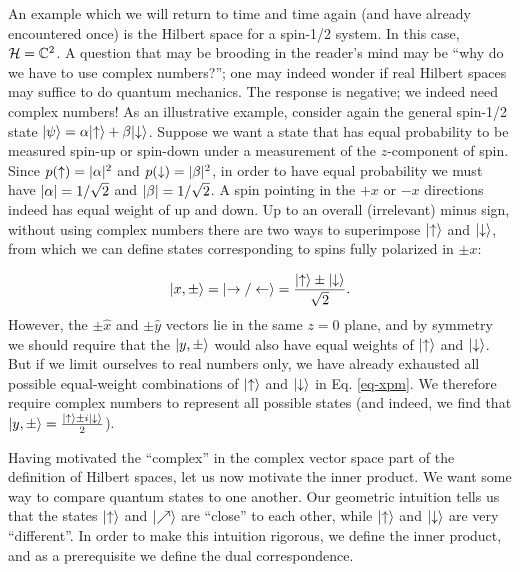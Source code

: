 An example which we will return to time and time again (and have already encountered once) is the Hilbert space for a spin-1/2 system. In this case, $\mathcal{H} = \mathbb{C}^2$. A question that may be brooding in the reader's mind may be ``why do we have to use complex numbers?''; one may indeed wonder if real Hilbert spaces may suffice to do quantum mechanics. The response is negative; we indeed need complex numbers! As an illustrative example, consider again the general spin-1/2 state $\lvert \psi \rangle = \alpha\lvert \uparrow \rangle + \beta\lvert \downarrow \rangle$. Suppose we want a state that has equal probability to be measured spin-up or spin-down under a measurement of the $z$-component of spin. Since $p(\uparrow) = \lvert \alpha \rvert^2$ and $p(\downarrow) = \lvert \beta \rvert^2$, in order to have equal probability we must have $\lvert \alpha \rvert = 1/\sqrt{2}$ and $\lvert \beta \rvert = 1/\sqrt{2}$. A spin pointing in the $+x$ or $-x$ directions indeed has equal weight of up and down. Up to an overall (irrelevant) minus sign, without using complex numbers there are two ways to superimpose $\lvert \uparrow \rangle$ and $\lvert \downarrow \rangle$, from which we can define states corresponding to spins fully polarized in $\pm x$:

\begin{equation}\label{eq-xpm}
    \lvert x, \pm \rangle = \lvert \rightarrow/\leftarrow \rangle =  \frac{\lvert \uparrow \rangle \pm \lvert \downarrow \rangle}{\sqrt{2}}.
\end{equation}
However, the $\pm \hat{x}$ and $\pm \hat{y}$ vectors lie in the same $z = 0$ plane, and by symmetry we should require that the $\lvert y, \pm \rangle$ would also have equal weights of $\lvert \uparrow \rangle$ and $\lvert \downarrow \rangle$. But if we limit ourselves to real numbers only, we have already exhausted all possible equal-weight combinations of $\lvert \uparrow \rangle$ and $\lvert \downarrow \rangle$ in Eq. \eqref{eq-xpm}. We therefore require complex  numbers to represent all possible states (and indeed, we find that $\lvert y, \pm \rangle = \frac{\lvert \uparrow \rangle \pm i \lvert \downarrow \rangle}{2}$).

Having motivated the ``complex'' in the complex vector space part of the definition of Hilbert spaces, let us now motivate the inner product. We want some way to compare quantum states to one another. Our geometric intuition tells us that the states $\lvert \uparrow \rangle$ and $\lvert \nearrow \rangle$ are ``close'' to each other, while $\lvert \uparrow \rangle$ and $\lvert \downarrow \rangle$ are very ``different''. In order to make this intuition rigorous, we define the inner product, and as a prerequisite we define the dual correspondence.

